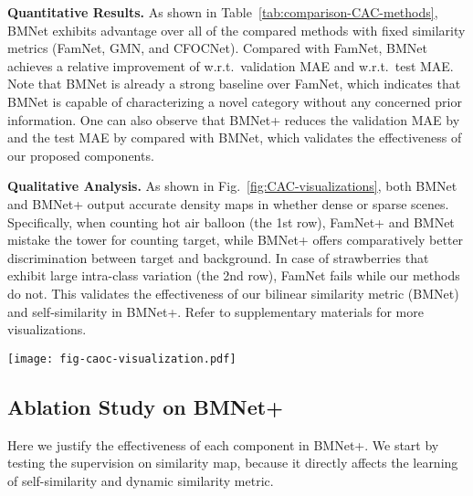 \documentclass[10pt,twocolumn,letterpaper]{article}
\newcommand{\margin}{\vspace{3pt}\noindent}
\begin{document}
\margin
\textbf{Quantitative Results.}
As shown in Table~\ref{tab:comparison-CAC-methods}, BMNet exhibits advantage over all of the compared methods with fixed similarity metrics (FamNet, GMN, and CFOCNet).
Compared with FamNet, BMNet achieves a relative improvement of  w.r.t.\ validation MAE and  w.r.t.\ test MAE. Note that BMNet is already a strong baseline over FamNet, which indicates that BMNet is capable of characterizing a novel category without any concerned prior information. One can also observe that BMNet+ reduces the validation MAE by  and the test MAE by  compared with BMNet, which validates the effectiveness of our proposed components.

\margin
\textbf{Qualitative Analysis.}
As shown in Fig.~\ref{fig:CAC-visualizations}, both BMNet and BMNet+ output accurate density maps in whether dense or sparse scenes. Specifically, when counting hot air balloon (the 1st row), FamNet+ and BMNet mistake the tower for counting target, while BMNet+ offers comparatively better discrimination between target and background. In case of strawberries that exhibit large intra-class variation (the 2nd row), FamNet fails while our methods do not. This validates the effectiveness of our bilinear similarity metric (BMNet) and self-similarity in BMNet+. Refer to supplementary materials for more visualizations.

\begin{figure*}[t]
	\centering
	\texttt{[image: fig-caoc-visualization.pdf]}\vspace{-5pt}
	\caption{\textbf{Qualitative results on the FSC147 dataset.} The samples on the left exhibit significant intra-class variations such as scale, pose, and illumination condition. The red boxes 
indicate exemplars.
Counting values are shown at the top-right corner. Our BMNet and BMNet+ can predict accurate density maps in both dense and sparse scenes.
Best viewed by zooming in.
	}
	\label{fig:CAC-visualizations}
	\vspace{-5pt}
\end{figure*}

\subsection{Ablation Study on BMNet+}
\label{exp:sl}
Here we justify the effectiveness of each component in BMNet+.
We start by testing the supervision on similarity map, because it directly affects the learning of self-similarity and dynamic similarity metric.
\end{document}
